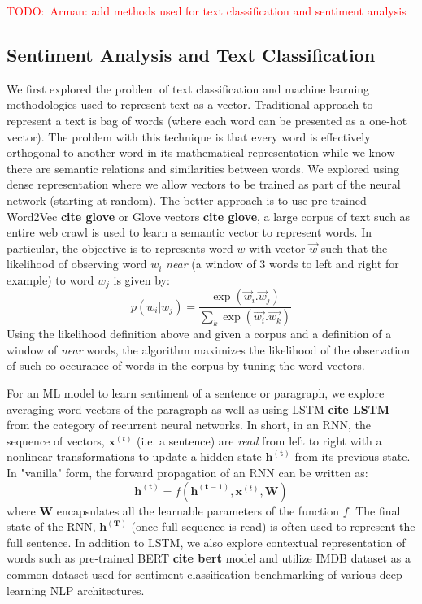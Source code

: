 \documentclass{article}
\newcommand{\TODO}[1]{\textcolor{red}{{TODO:~#1}}}
\begin{document}
\TODO{Arman: add methods used for text classification and sentiment analysis \\ }%

\subsection{Sentiment Analysis and Text Classification}
We first explored the problem of text classification and machine learning methodologies used to represent text as a vector. Traditional 
approach to represent a text is bag of words (where each word
can be presented as a one-hot vector). The problem with this technique
is that every word is effectively orthogonal to another word in its
mathematical representation while we know there are semantic relations and 
similarities between words. We explored using dense representation
where we allow vectors to be trained as part of the neural network 
(starting at random). The better approach is to use pre-trained Word2Vec {\bf cite glove} or Glove vectors {\bf cite glove}, a large corpus of text
such as entire web crawl is used to learn a semantic vector to represent words.
In particular, the objective is to represents word $w$ with vector $\vec{w}$ such that the likelihood of observing word $w_i$ {\it near} (a window of 3 words to left and right for example) to word $w_j$ is given by:
\begin{equation}
p(w_i|w_j) = \frac{\exp(\vec{w}_i . \vec{w}_j)}{\sum_k \exp(\vec{w_i}.\vec{w_k})}
\end{equation}
Using the likelihood definition above and 
given a corpus and a definition of a window of {\it near} words, the
algorithm maximizes the likelihood of the observation of such co-occurance
of words in the corpus by tuning the word vectors.

For an ML model to learn sentiment of a sentence or paragraph, we explore
averaging word vectors of the paragraph as well as using LSTM {\bf cite LSTM}
from the category of recurrent neural networks. In short, in an RNN, 
the sequence of vectors, $\mathbf{x}^{(t)}$ (i.e. a sentence) are {\em read} 
from left to right with a nonlinear
transformations to update a hidden state $\mathbf{h^{(t)}}$ from
its previous state. In "vanilla" form, the forward propagation of
an RNN  can be written as:
\begin{equation}
    \mathbf{h^{(t)}} = f(\mathbf{h^{(t-1)}}, \mathbf{x}^{(t)}, \mathbf{W})
\end{equation}
where ${\mathbf W}$ encapsulates all the learnable parameters of the function $f$. The final state of the RNN, $\mathbf{h^{(T)}}$ (once full
sequence is read) is often used to represent the full sentence. 
In addition to LSTM, we also explore contextual representation
of words such as pre-trained BERT {\bf cite bert} model and
utilize IMDB dataset as a common dataset used for sentiment classification
benchmarking of various deep learning NLP architectures.
\end{document}
